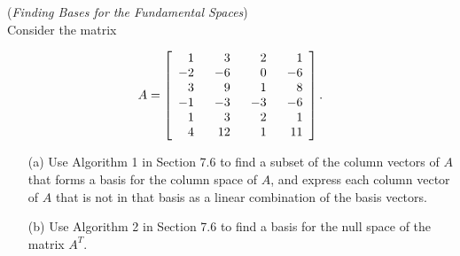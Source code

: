 \vspace{3mm}


\begin{exer}(\textit{Finding Bases for the Fundamental Spaces})\\
Consider the matrix

\begin{displaymath}
A = \left[\begin{array}{rrrr} 1& \hspace{5mm} 3& \hspace{5mm} 2&\hspace{5mm} 1\\ -2 & -6 & 0 & -6 \\ 3 & 9 & 1 & 8 \\ -1 & -3 & -3 & -6 \\ 1 & 3 & 2 & 1 \\ 4 & 12 & 1 & 11 \end{array} \right].
\end{displaymath}

\begin{enumerate}

\item[(a)] Use Algorithm 1 in Section 7.6 to find a subset of the column vectors of $A$ that forms a basis for the column space of $A$, and express each column vector of $A$ that is not in that basis as a linear combination of the basis vectors.

\vspace{2mm}

\item[(b)] Use Algorithm 2 in Section 7.6 to find a basis for the null space of the matrix $A^{T}$.
\end{enumerate}

\end{exer}


